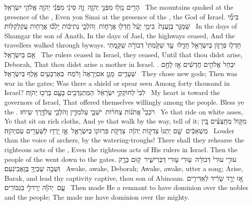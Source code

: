 {הָרִ֥ים נָזְל֖וּ מִפְּנֵ֣י יְהֹוָ֑ה \setuma  זֶ֣ה סִינַ֔י מִפְּנֵ֕י יְהֹוָ֖ה אֱלֹהֵ֥י יִשְׂרָאֵֽל׃ \setuma }
{The mountains quaked at the presence of the \lord, Even yon Sinai at the presence of the \lord, the God of Israel.}
{בִּימֵ֞י שַׁמְגַּ֤ר בֶּן\maqqaf עֲנָת֙ \setuma  בִּימֵ֣י יָעֵ֔ל חָֽדְל֖וּ אֳרָח֑וֹת \setuma  וְהֹלְכֵ֣י נְתִיב֔וֹת יֵלְכ֕וּ אֳרָח֖וֹת עֲקַלְקַלּֽוֹת׃ \setuma }
{In the days of Shamgar the son of Anath, In the days of Jael, the highways ceased, And the travellers walked through byways.}
{חָדְל֧וּ פְרָז֛וֹן בְּיִשְׂרָאֵ֖ל חָדֵ֑לּוּ \setuma  עַ֤ד שַׁקַּ֙מְתִּי֙ דְּבוֹרָ֔ה שַׁקַּ֥מְתִּי אֵ֖ם בְּיִשְׂרָאֵֽל׃ \setuma }
{The rulers ceased in Israel, they ceased, Until that thou didst arise, Deborah, That thou didst arise a mother in Israel. .}
{יִבְחַר֙ אֱלֹהִ֣ים חֲדָשִׁ֔ים אָ֖ז לָחֶ֣ם שְׁעָרִ֑ים \setuma  מָגֵ֤ן אִם\maqqaf יֵֽרָאֶה֙ וָרֹ֔מַח \setuma  בְּאַרְבָּעִ֥ים אֶ֖לֶף בְּיִשְׂרָאֵֽל׃ \setuma }
{They chose new gods; Then was war in the gates; Was there a shield or spear seen Among forty thousand in Israel?}
{לִבִּי֙ לְחוֹקְקֵ֣י יִשְׂרָאֵ֔ל \setuma  הַמִּֽתְנַדְּבִ֖ים בָּעָ֑ם בָּרְכ֖וּ יְהֹוָֽה׃ \setuma }
{My heart is toward the governors of Israel, That offered themselves willingly among the people. Bless ye the \lord.}
{רֹכְבֵי֩ אֲתֹנ֨וֹת צְחֹר֜וֹת \setuma  יֹשְׁבֵ֧י עַל\maqqaf מִדִּ֛ין וְהֹלְכֵ֥י עַל\maqqaf דֶּ֖רֶךְ שִֽׂיחוּ׃ \setuma }
{Ye that ride on white asses, Ye that sit on rich cloths, And ye that walk by the way, tell of it;}
{מִקּ֣וֹל מְחַֽצְצִ֗ים בֵּ֚ין מַשְׁאַבִּ֔ים \setuma  שָׁ֤ם יְתַנּוּ֙ צִדְק֣וֹת יְהֹוָ֔ה \setuma  צִדְקֹ֥ת פִּרְזוֹנ֖וֹ בְּיִשְׂרָאֵ֑ל \setuma  אָ֛ז יָֽרְד֥וּ לַשְּׁעָרִ֖ים עַם\maqqaf יְהֹוָֽה׃ \setuma }
{Louder than the voice of archers, by the watering-troughs! There shall they rehearse the righteous acts of the \lord, Even the righteous acts of His rulers in Israel. Then the people of the \lord\space went down to the gates.}
{עוּרִ֤י עוּרִי֙ דְּבוֹרָ֔ה \setuma  ע֥וּרִי ע֖וּרִי דַּבְּרִי\maqqaf שִׁ֑יר \setuma  ק֥וּם בָּרָ֛ק וּֽשְׁבֵ֥ה שֶׁבְיְךָ֖ בֶּן\maqqaf אֲבִינֹֽעַם׃ \setuma }
{Awake, awake, Deborah; Awake, awake, utter a song; Arise, Barak, and lead thy captivity captive, thou son of Abinoam.}
{אָ֚ז יְרַ֣ד שָׂרִ֔יד לְאַדִּירִ֖ים עָ֑ם \setuma  יְהֹוָ֕ה יְרַד\maqqaf לִ֖י בַּגִּבּוֹרִֽים׃ \setuma }
{Then made He a remnant to have dominion over the nobles and the people; The \lord\space made me have dominion over the mighty.}

